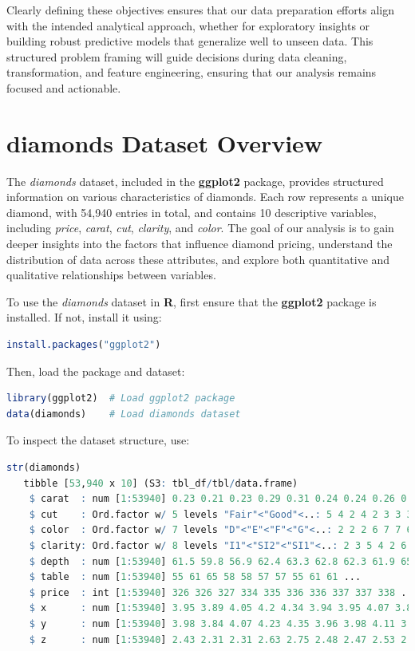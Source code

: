 \documentclass[
]{book}
\theoremstyle{definition}
\theoremstyle{definition}
\theoremstyle{definition}
\theoremstyle{definition}
\theoremstyle{remark}
\begin{document}
Clearly defining these objectives ensures that our data preparation efforts align with the intended analytical approach, whether for exploratory insights or building robust predictive models that generalize well to unseen data. This structured problem framing will guide decisions during data cleaning, transformation, and feature engineering, ensuring that our analysis remains focused and actionable.

\section{diamonds Dataset Overview}\label{Data-pre-diamonds}

The \emph{diamonds} dataset, included in the \textbf{ggplot2} package, provides structured information on various characteristics of diamonds. Each row represents a unique diamond, with 54,940 entries in total, and contains 10 descriptive variables, including \emph{price}, \emph{carat}, \emph{cut}, \emph{clarity}, and \emph{color}. The goal of our analysis is to gain deeper insights into the factors that influence diamond pricing, understand the distribution of data across these attributes, and explore both quantitative and qualitative relationships between variables.

To use the \emph{diamonds} dataset in \textbf{R}, first ensure that the \textbf{ggplot2} package is installed. If not, install it using:

\begin{lstlisting}[language=R]
install.packages("ggplot2") 
\end{lstlisting}

Then, load the package and dataset:

\begin{lstlisting}[language=R]
library(ggplot2)  # Load ggplot2 package
data(diamonds)    # Load diamonds dataset
\end{lstlisting}

To inspect the dataset structure, use:

\begin{lstlisting}[language=R]
str(diamonds)   
   tibble [53,940 x 10] (S3: tbl_df/tbl/data.frame)
    $ carat  : num [1:53940] 0.23 0.21 0.23 0.29 0.31 0.24 0.24 0.26 0.22 0.23 ...
    $ cut    : Ord.factor w/ 5 levels "Fair"<"Good"<..: 5 4 2 4 2 3 3 3 1 3 ...
    $ color  : Ord.factor w/ 7 levels "D"<"E"<"F"<"G"<..: 2 2 2 6 7 7 6 5 2 5 ...
    $ clarity: Ord.factor w/ 8 levels "I1"<"SI2"<"SI1"<..: 2 3 5 4 2 6 7 3 4 5 ...
    $ depth  : num [1:53940] 61.5 59.8 56.9 62.4 63.3 62.8 62.3 61.9 65.1 59.4 ...
    $ table  : num [1:53940] 55 61 65 58 58 57 57 55 61 61 ...
    $ price  : int [1:53940] 326 326 327 334 335 336 336 337 337 338 ...
    $ x      : num [1:53940] 3.95 3.89 4.05 4.2 4.34 3.94 3.95 4.07 3.87 4 ...
    $ y      : num [1:53940] 3.98 3.84 4.07 4.23 4.35 3.96 3.98 4.11 3.78 4.05 ...
    $ z      : num [1:53940] 2.43 2.31 2.31 2.63 2.75 2.48 2.47 2.53 2.49 2.39 ...
\end{lstlisting}
\end{document}
